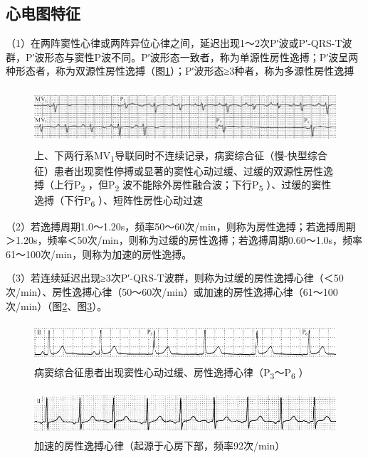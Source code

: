 \subsection{心电图特征}

（1）在两阵窦性心律或两阵异位心律之间，延迟出现1～2次P′波或P′-QRS-T波群，P′波形态与窦性P波不同。P′波形态一致者，称为单源性房性逸搏；P′波呈两种形态者，称为双源性房性逸搏（图\ref{fig12-2}）；P′波形态≥3种者，称为多源性房性逸搏

\begin{figure}[!htbp]
 \centering
 \includegraphics[width=5.78125in,height=0.83333in]{./images/Image00195.jpg}
 \captionsetup{justification=centering}
 \caption{上、下两行系MV\textsubscript{1}导联同时不连续记录，病窦综合征（慢-快型综合征）患者出现窦性停搏或显著的窦性心动过缓、过缓的双源性房性逸搏（上行P\textsubscript{2} ，但P\textsubscript{2} 波不能除外房性融合波；下行P\textsubscript{5} ）、过缓的窦性逸搏（下行P\textsubscript{6} ）、短阵性房性心动过速}
 \label{fig12-2}
  \end{figure} 


（2）若逸搏周期1.0～1.20s，频率50～60次/min，则称为房性逸搏；若逸搏周期＞1.20s，频率＜50次/min，则称为过缓的房性逸搏；若逸搏周期0.60～1.0s，频率61～100次/min，则称为加速的房性逸搏。

（3）若连续延迟出现≥3次P′-QRS-T波群，则称为过缓的房性逸搏心律（＜50次/min）、房性逸搏心律（50～60次/min）或加速的房性逸搏心律（61～100次/min）（图\ref{fig12-3}、图\ref{fig12-4}）。

\begin{figure}[!htbp]
 \centering
 \includegraphics[width=5.58333in,height=0.57292in]{./images/Image00196.jpg}
 \captionsetup{justification=centering}
 \caption{病窦综合征患者出现窦性心动过缓、房性逸搏心律（P\textsubscript{3}～P\textsubscript{6} ）}
 \label{fig12-3}
  \end{figure} 


\begin{figure}[!htbp]
 \centering
 \includegraphics[width=5.58333in,height=0.65625in]{./images/Image00197.jpg}
 \captionsetup{justification=centering}
 \caption{加速的房性逸搏心律（起源于心房下部，频率92次/min）}
 \label{fig12-4}
  \end{figure} 

